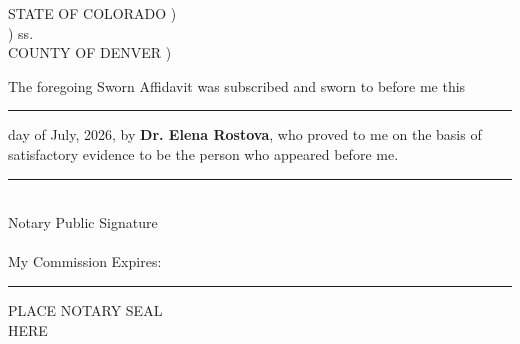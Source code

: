 \documentclass[12pt,letterpaper]{article}
\begin{document}
\noindent
\begin{tcolorbox}[colframe=LegalNavy, colback=LegalLight, arc=4pt, outer arc=4pt, boxrule=1.2pt, title=\textbf{\MakeUppercase{Notary Acknowledgement}}]
  STATE OF COLORADO \hfill ) \\
  \hfill ) ss. \\
  COUNTY OF DENVER \hfill ) \\
  \par\vspace{1em}
  The foregoing Sworn Affidavit was subscribed and sworn to before me this \rule{1.5cm}{0.5pt} day of July, 2026, by \textbf{Dr. Elena Rostova}, who proved to me on the basis of satisfactory evidence to be the person who appeared before me.
  \par\vspace{1.5em}
  \noindent
  \begin{minipage}[t]{0.52\textwidth}
    \rule{0.9\textwidth}{0.5pt} \\
    Notary Public Signature \\
    \\
    My Commission Expires: \rule{3.0cm}{0.5pt}
  \end{minipage}
  \hfill
  \begin{minipage}[t]{0.4\textwidth}
    \begin{tcolorbox}[colframe=LegalGold, colback=white, boxrule=1.0pt, arc=3pt, width=1.6in, height=1.1in, valign=center, halign=center]
      \textcolor{LegalGold}{\scriptsize\sffamily PLACE NOTARY SEAL\\HERE}
    \end{tcolorbox}
  \end{minipage}
\end{tcolorbox}
\end{document}
